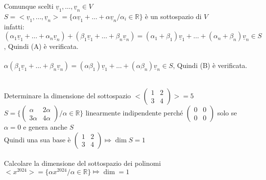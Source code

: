 \begin{proposizione}
	\phantom{text}\\
	Comunque scelti $\underline{v}_1,\dots,\underline{v}_n\in V$\\
	$S=<\underline{v}_1,\dots,\underline{v}_n>=\{\alpha\underline{v}_1+\dots+\alpha\underline{v}_n/\alpha_i\in\mathbb{R}\}$ è un sottospazio di $V$\\
	infatti: $(\alpha_1\underline{v}_1+\dots+\alpha_n\underline{v}_n)+(\beta_1\underline{v}_1+\dots+\beta_n\underline{v}_n)=(\alpha_1+\beta_1)\underline{v}_1+\dots+(\alpha_n+\beta_n)\underline{v}_n\in S$, Quindi (A) è verificata.\\\\
	$\alpha(\beta_1\underline{v}_1+\dots+\beta_n\underline{v}_n)=(\alpha\beta_1)\underline{v}_1+\dots+(\alpha\beta_n)\underline{v}_n\in S$, Quindi (B) è verificata.
\end{proposizione}

\begin{es}
	\phantom{text}\\
	Determinare la dimensione del sottospazio $<\begin{pmatrix}
		1&2\\
		3&4
	\end{pmatrix}>=5$\\
	$S=\{\begin{pmatrix}
	       \alpha& 2\alpha\\
		   3\alpha& 4\alpha
	     \end{pmatrix}/ \alpha\in\mathbb{R}\}$ linearmente indipendente perché $\begin{pmatrix}
			0&0\\
			0&0
		 \end{pmatrix}$ solo se $\alpha=0$ e genera anche $S$\\
		 Quindi una sua base è $\begin{pmatrix}
			1&2\\
			3&4
		 \end{pmatrix}\Mapsto\dim S=1$\\\\
		 Calcolare la dimensione del sottospazio dei polinomi $<x^{2024}>=\{\alpha x^{2024}/\alpha\in\mathbb{R}\}\Mapsto\dim =1$
\end{es}

